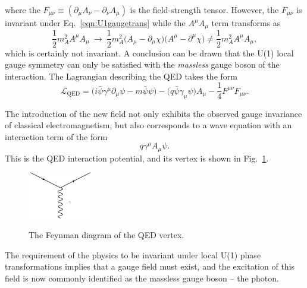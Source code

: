 where the $F_{\mu\nu}\equiv(\partial_{\mu}A_{\nu}-\partial_{\nu}A_{\mu})$ is the field-strength tensor.
However, the $F_{\mu\nu}$ is invariant under Eq.~\ref{eqn:U1gaugetrans} while the $A^{\mu}A_{\mu}$ term transforms as
\begin{equation}
\frac{1}{2}m_{A}^{2}A^{\mu}A_{\mu}\ \to\ \frac{1}{2}m_{A}^{2}\big(A_{\mu}-\partial_{\mu}\chi\big)\big(A^{\mu}-\partial^{\mu}\chi\big)\neq\frac{1}{2}m_{A}^{2}A^{\mu}A_{\mu},
\end{equation}
which is certainly not invariant. A conclusion can be drawn that the U(1) local gauge symmetry can only be satisfied with the \emph{massless} gauge boson of the interaction.
The Lagrangian describing the QED takes the form
\begin{equation}
\label{eqn:LagQED}
\mathcal{L}_{\text{QED}}=\big(i\bar{\psi}\gamma^{\mu}\partial_{\mu}\psi - m\bar{\psi}\psi\big) - \big(q\bar{\psi}\gamma_{\mu}\psi\big)A_{\mu} -\frac{1}{4}F^{\mu\nu}F_{\mu\nu}.
\end{equation}

The introduction of the new field not only exhibits the observed gauge invariance of classical electromagnetism, but also corresponds to a wave equation with an interaction term of the form 
\begin{equation}
\label{eqn:interactionQED}
q\gamma^{\mu}A_{\mu}\psi.
\end{equation}
This is the QED interaction potential, and its vertex is shown in Fig.~\ref{fig:QEDvtx}.
\begin{figure}[!ht]
  \begin{center}  
    \includegraphics[width=0.25\textwidth]{Fig/QED_vertex}\\
    \caption{The Feynman diagram of the QED vertex. \label{fig:QEDvtx}} 
  \end{center}
\end{figure} 
The requirement of the physics to be invariant under local U(1) phase transformations implies that a gauge field must exist, and the excitation of this field is now commonly identified as the massless gauge boson -- the photon.

